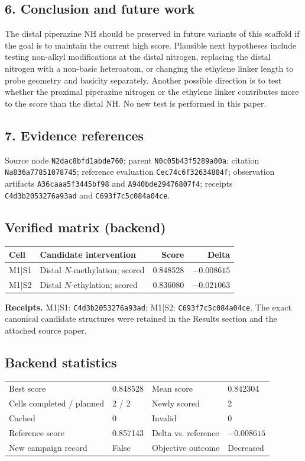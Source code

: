 \subsection*{6. Conclusion and future work}
The distal piperazine NH should be preserved in future variants of this scaffold if the goal is to maintain the current high score. Plausible next hypotheses include testing non-alkyl modifications at the distal nitrogen, replacing the distal nitrogen with a non-basic heteroatom, or changing the ethylene linker length to probe geometry and basicity separately. Another possible direction is to test whether the proximal piperazine nitrogen or the ethylene linker contributes more to the score than the distal NH. No new test is performed in this paper.

\subsection*{7. Evidence references}
Source node \nolinkurl{N2dac8bfd1abde760}; parent \nolinkurl{N0c05b43f5289a00a}; citation \nolinkurl{Na836a77851078745}; reference evaluation \nolinkurl{Cec74c6f32634804f}; observation artifacts \nolinkurl{A36caaa5f3445bf98} and \nolinkurl{A940bde29476807f4}; receipts \nolinkurl{C4d3b2053276a93ad} and \nolinkurl{C693f7c5c084a04ce}.

\subsection*{Verified matrix (backend)}
\begin{tabularx}{\linewidth}{@{}lXrr@{}}
\toprule
\textbf{Cell} & \textbf{Candidate intervention} & \textbf{Score} & \textbf{Delta}\\
\midrule
M1|S1 & Distal $N$-methylation; scored & 0.848528 & $-0.008615$\\
M1|S2 & Distal $N$-ethylation; scored & 0.836080 & $-0.021063$\\
\bottomrule
\end{tabularx}
\smallskip
\textbf{Receipts.} M1|S1: \nolinkurl{C4d3b2053276a93ad}; M1|S2: \nolinkurl{C693f7c5c084a04ce}. The exact canonical candidate structures were retained in the Results section and the attached source paper.
\subsection*{Backend statistics}
\begin{tabularx}{\linewidth}{@{}>{\raggedright\arraybackslash}Xl>{\raggedright\arraybackslash}Xl@{}}
\toprule
Best score & 0.848528 & Mean score & 0.842304\\
Cells completed / planned & 2 / 2 & Newly scored & 2\\
Cached & 0 & Invalid & 0\\
Reference score & 0.857143 & Delta vs. reference & $-0.008615$\\
New campaign record & False & Objective outcome & Decreased\\
\bottomrule
\end{tabularx}
\par\endgroup
